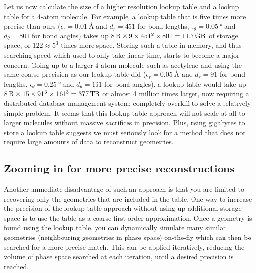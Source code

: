 Let us now calculate the size of a higher resolution lookup table and a lookup table for a 4-atom molecule. For example, a lookup table that is five times more precise than ours ($\epsilon_r = \SI{0.01}{\angstrom}$ and $d_r = 451$ for bond lengths, $\epsilon_\theta = \SI{0.05}{\degree}$ and $d_\theta = 801$ for bond angles) takes up $\SI{8}{\byte} \times 9 \times 451^2 \times 801 = \SI{11.7}{\giga\byte}$ of storage space, or $122 \approx 5^3$ times more space. Storing such a table in memory, and thus searching speed which used to only take linear time, starts to become a major concern. Going up to a larger $4$-atom molecule such as acetylene and using the same coarse precision as our lookup table did ($\epsilon_r = \SI{0.05}{\angstrom}$ and $d_r = 91$ for bond lengths, $\epsilon_\theta = \SI{0.25}{\degree}$ and $d_\theta = 161$ for bond angles), a lookup table would take up $\SI{8}{\byte} \times 15 \times 91^3 \times 161^3 = \SI{377}{\tera\byte}$ or almost 4 million times larger, now requiring a distributed database management system; completely overkill to solve a relatively simple problem. It seems that this lookup table approach will not scale at all to larger molecules without massive sacrifices in precision. Plus, using gigabytes to store a lookup table suggests we must seriously look for a method that does not require large amounts of data to reconstruct geometries.

\subsection{Zooming in for more precise reconstructions}

Another immediate disadvantage of such an approach is that you are limited to recovering only the geometries that are included in the table. One way to increase the precision of the lookup table approach without using up additional storage space is to use the table as a coarse first-order approximation. Once a geometry is found using the lookup table, you can dynamically simulate many similar geometries (neighbouring geometries in phase space) on-the-fly which can then be searched for a more precise match. This can be applied iteratively, reducing the volume of phase space searched at each iteration, until a desired precision is reached.

